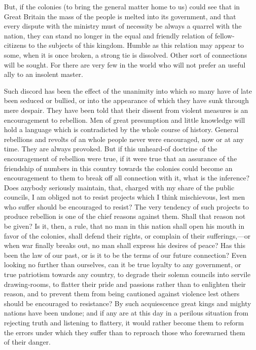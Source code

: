 But, if the colonies (to bring the general matter home to us) could see that in Great Britain the mass of the people is melted into its government, and that every dispute with the ministry must of necessity be always a quarrel with the nation, they can stand no longer in the equal and friendly relation of fellow-citizens to the subjects of this kingdom. Humble as this relation may appear to some, when it is once broken, a strong tie is dissolved. Other sort of connections will be sought. For there are very few in the world who will not prefer an useful ally to an insolent master.

Such discord has been the effect of the unanimity into which so many have of late been seduced or bullied, or into the appearance of which they have sunk through mere despair. They have been told that their dissent from violent measures is an encouragement to rebellion. Men of great presumption and little knowledge will hold a language which is contradicted by the whole course of history. General rebellions and revolts of an whole people never were encouraged, now or at any time. They are always provoked. But if this unheard-of doctrine of the encouragement of rebellion were true, if it were true that an assurance of the friendship of numbers in this country towards the colonies could become an encouragement to them to break off all connection with it, what is the inference? Does anybody seriously maintain, that, charged with my share of the public councils, I am obliged not to resist projects which I think mischievous, lest men who suffer should be encouraged to resist? The very tendency of such projects to produce rebellion is one of the chief reasons against them. Shall that reason not be given? Is it, then, a rule, that no man in this nation shall open his mouth in favor of the colonies, shall defend their rights, or complain of their sufferings,—or when war finally breaks out, no man shall express his desires of peace? Has this been the law of our past, or is it to be the terms of our future connection? Even looking no further than ourselves, can it be true loyalty to any government, or true patriotism towards any country, to degrade their solemn councils into servile drawing-rooms, to flatter their pride and passions rather than to enlighten their reason, and to prevent them from being cautioned against violence lest others should be encouraged to resistance? By such acquiescence great kings and mighty nations have been undone; and if any are at this day in a perilous situation from rejecting truth and listening to flattery, it would rather become them to reform the errors under which they suffer than to reproach those who forewarned them of their danger.

